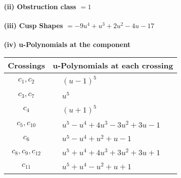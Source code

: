 \documentclass[1p]{elsarticle_modified}
\theoremstyle{definition}
\begin{document}
\flushleft \textbf{(ii) Obstruction class $= 1$}\\~\\
\flushleft \textbf{(iii) Cusp Shapes $= -9 u^4+u^3+2 u^2-4 u-17$}\\~\\
\newpage\renewcommand{\arraystretch}{1}
\flushleft \textbf{(iv) u-Polynomials at the component}\newline \\
\begin{tabular}{m{50pt}|m{274pt}}
Crossings & \hspace{64pt}u-Polynomials at each crossing \\
\hline $$\begin{aligned}c_{1},c_{2}\end{aligned}$$&$\begin{aligned}
&(u-1)^5
\end{aligned}$\\
\hline $$\begin{aligned}c_{3},c_{7}\end{aligned}$$&$\begin{aligned}
&u^5
\end{aligned}$\\
\hline $$\begin{aligned}c_{4}\end{aligned}$$&$\begin{aligned}
&(u+1)^5
\end{aligned}$\\
\hline $$\begin{aligned}c_{5},c_{10}\end{aligned}$$&$\begin{aligned}
&u^5- u^4+4 u^3-3 u^2+3 u-1
\end{aligned}$\\
\hline $$\begin{aligned}c_{6}\end{aligned}$$&$\begin{aligned}
&u^5- u^4+u^2+u-1
\end{aligned}$\\
\hline $$\begin{aligned}c_{8},c_{9},c_{12}\end{aligned}$$&$\begin{aligned}
&u^5+u^4+4 u^3+3 u^2+3 u+1
\end{aligned}$\\
\hline $$\begin{aligned}c_{11}\end{aligned}$$&$\begin{aligned}
&u^5+u^4- u^2+u+1
\end{aligned}$\\
\hline
\end{tabular}\\~\\
\end{document}
